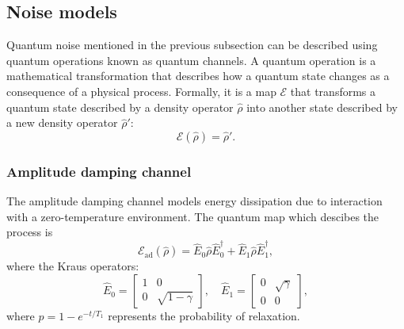 \subsection{Noise models}
Quantum noise mentioned in the previous subsection can be described using quantum operations known as quantum channels. 
A quantum operation is a mathematical transformation that describes how a quantum state changes as a consequence of a physical process. 
Formally, it is a map $\mathcal{E}$ that transforms a quantum state described by a density operator $\hat{\rho}$ into another state described by a new density operator $\hat{\rho}'$:
\begin{equation}
    \mathcal{E}(\hat{\rho}) = \hat{\rho}'\label{eq:quantum_map}.
\end{equation}

\subsubsection{Amplitude damping channel}
The amplitude damping channel models energy dissipation due to interaction with a zero-temperature environment. The quantum map which descibes the process is 
\begin{equation}\label{eq:amplitude_damping}
    \mathcal{E}_{\text{ad}}(\hat{\rho}) = \hat{E}_0 \hat{\rho} \hat{E}_0^{\dagger} + \hat{E}_1 \hat{\rho} \hat{E}_1^{\dagger},
\end{equation}
where the Kraus operators:
\begin{equation}
    \hat{E}_0 = \begin{bmatrix} 1 & 0 \\ 0 & \sqrt{1 - \gamma} \end{bmatrix}, \quad
    \hat{E}_1 = \begin{bmatrix} 0 & \sqrt{\gamma} \\ 0 & 0 \end{bmatrix},
\end{equation}
where $p = 1 - e^{-t/T_1}$ represents the probability of relaxation.

